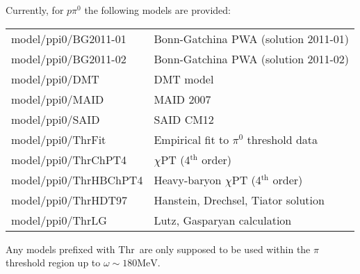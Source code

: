 \documentclass[a4paper,10pt]{article}
\def\tt{\ttfamily}
\def\rm{\rmfamily}
\begin{document}
Currently, for $p \pi^0$ the following models are provided: \vspace{-0.25em}\\
\begin{tabular}{ll}
\hspace{-0.5em}\tt model/ppi0/BG2011-01\rm & Bonn-Gatchina PWA (solution 2011-01) \cite{Model_BnGa} \vspace{-0.5em}\\
\hspace{-0.5em}\tt model/ppi0/BG2011-02\rm & Bonn-Gatchina PWA (solution 2011-02) \cite{Model_BnGa} \vspace{-0.5em}\\
\hspace{-0.5em}\tt model/ppi0/DMT\rm & DMT model \cite{Model_DMT} \vspace{-0.5em}\\
\hspace{-0.5em}\tt model/ppi0/MAID\rm & MAID 2007 \cite{Model_MAID} \vspace{-0.5em}\\
\hspace{-0.5em}\tt model/ppi0/SAID\rm & SAID CM12 \cite{Model_SAID} \vspace{-0.5em}\\
\hspace{-0.5em}\tt model/ppi0/ThrFit\rm & Empirical fit to $\pi^0$ threshold data \cite{PRL_pi0thres} \vspace{-0.5em}\\
\hspace{-0.5em}\tt model/ppi0/ThrChPT4\rm & $\chi$PT (4$^\mathrm{th}$ order) \cite{Model_ChPT4} \vspace{-0.5em}\\
\hspace{-0.5em}\tt model/ppi0/ThrHBChPT4\rm & Heavy-baryon $\chi$PT (4$^\mathrm{th}$ order) \cite{Model_HBChPT4} \vspace{-0.5em}\\
\hspace{-0.5em}\tt model/ppi0/ThrHDT97\rm & Hanstein, Drechsel, Tiator solution \cite{Model_HDT97} \vspace{-0.5em}\\
\hspace{-0.5em}\tt model/ppi0/ThrLG\rm & Lutz, Gasparyan calculation \cite{Model_LG} \vspace{-0.1em}\\
\end{tabular}

Any models prefixed with \tt Thr\rm\ are only supposed to be used within the $\pi$ threshold region up to
$\omega\sim 180\mathrm{MeV}$.
\end{document}
